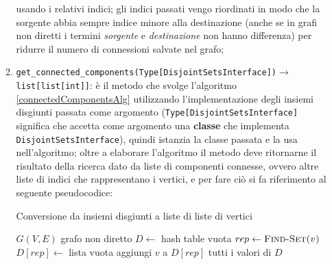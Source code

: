 \begin{enumerate}
\begin{enumerate}[resume]
                        usando i relativi indici; gli indici passati vengo riordinati in modo che la sorgente abbia
                        sempre indice minore alla destinazione (anche se in grafi non diretti i termini \textit{sorgente}
                        e \textit{destinazione} non hanno differenza) per ridurre il numero di connessioni salvate nel grafo;
                  \item \texttt{get\_connected\_components(Type[DisjointSetsInterface])\linebreak $\rightarrow$ list[list[int]]}:
                        è il metodo che svolge l'algoritmo \ref{connectedComponentsAlg} utilizzando l'implementazione degli
                        insiemi disgiunti passata come argomento (\texttt{Type[DisjointSetsInterface]} significa che accetta come
                        argomento una \textbf{classe} che implementa \texttt{DisjointSetsInterface}), quindi istanzia la classe
                        passata e la usa nell'algoritmo; oltre a elaborare l'algoritmo il metodo deve ritornarne il risultato
                        della ricerca dato da liste di componenti connesse, ovvero altre liste di indici che rappresentano i vertici,
                        e per fare ciò si fa riferimento al seguente pseudocodice:

                        \begin{algorithm}
                              \caption{Conversione da insiemi disgiunti a liste di liste di vertici}\label{conversion}
                              \begin{algorithmic}[1]
                                    \ENSURE $G(V,E)$ grafo non diretto
                                    \STATE $D\leftarrow$ hash table vuota
                                    \STATE $rep \leftarrow \textsc{Find-Set($v$)}$
                                    \STATE $D[rep]\leftarrow$ lista vuota
                                    \ENDIF
                                    \STATE aggiungi $v$ a $D[rep]$
                                    \ENDFOR
                                    \RETURN tutti i valori di $D$
                              \end{algorithmic}
                        \end{algorithm}


\end{enumerate}
\end{enumerate}
